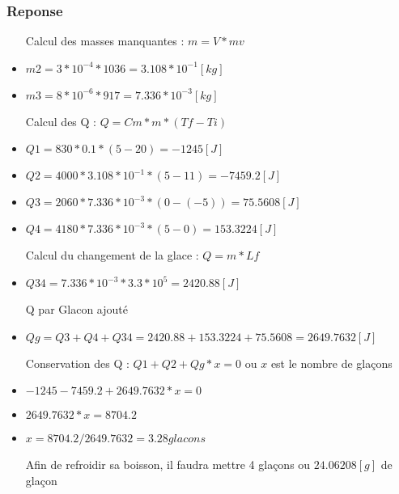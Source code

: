 \subsubsection{Reponse}
\begin{itemize}
    \item[Calcul des masses manquantes] : $m = V*mv$
    \item $m2  = 3*10^{-4} * 1036 = 3.108*10^{-1}[kg]$ 
    \item $m3  = 8 * 10^{-6} * 917 = 7.336*10^{-3}[kg]$ 
    \item[Calcul des Q] : $Q = Cm * m * (Tf-Ti)$
    \item $Q1 =  830 * 0.1 * (5-20) = -1245[J]$
    \item $Q2 = 4000* 3.108*10^{-1} * (5-11) = -7459.2[J]$
    \item $Q3 = 2060 * 7.336*10^{-3} * (0-(-5)) = 75.5608[J]$
    \item $Q4 = 4180 * 7.336*10^{-3} * (5-0) = 153.3224[J]$
    \item[Calcul du changement de la glace] : $Q = m * Lf$
    \item $Q34 = 7.336*10^{-3} * 3.3 * 10^5 = 2420.88[J]$
    \item[Q par Glacon ajouté]
    \item $Qg = Q3 + Q4 + Q34 = 2420.88 + 153.3224 + 75.5608 = 2649.7632[J]$
    \item[Conservation des Q] : $Q1 + Q2 + Qg*x = 0$ ou $x$ est le nombre de glaçons
    \item $-1245 - 7459.2 + 2649.7632 * x = 0$
    \item $2649.7632*x = 8704.2$
    \item $x = 8704.2/2649.7632 = 3.28 glacons$
    \item[Afin de refroidir sa boisson, il faudra mettre 4 glaçons] ou $24.06208[g]$ de glaçon
\end{itemize}